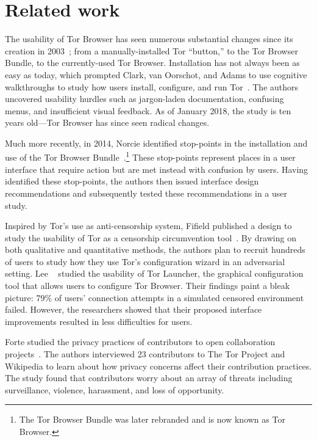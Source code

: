\section{Related work}
\label{sec:related-work}

The usability of Tor Browser has seen numerous substantial changes since its
creation in 2003~\cite{Syverson2005a}; from a manually-installed Tor ``button,''
to the Tor Browser Bundle, to the currently-used Tor Browser.  Installation has
not always been as easy as today, which prompted Clark, van Oorschot, and Adams
to use cognitive walkthroughs to study how users install, configure, and run
Tor~\cite{Clark2007a}.  The authors uncovered usability hurdles such as
jargon-laden documentation, confusing menus, and insufficient visual feedback.
As of January 2018, the study is ten years old---Tor Browser has since seen
radical changes.

Much more recently, in 2014, Norcie \ea identified stop-points in the
installation and use of the Tor Browser Bundle~\cite{Norcie2014a}.\footnote{The
Tor Browser Bundle was later rebranded and is now known as Tor Browser.}  These
stop-points represent places in a user interface that require action but are met
instead with confusion by users.  Having identified these stop-points, the
authors then issued interface design recommendations and subsequently tested
these recommendations in a user study.

Inspired by Tor's use as anti-censorship system, Fifield \ea published a design
to study the usability of Tor as a censorship circumvention
tool~\cite{Fifield2015a}.  By drawing on both qualitative and quantitative
methods, the authors plan to recruit hundreds of users to study how they use
Tor's configuration wizard in an adversarial setting.  Lee \ea~\cite{Lee2017a}
studied the usability of Tor Launcher, the graphical configuration tool that
allows users to configure Tor Browser.  Their findings paint a bleak picture:
79\% of users' connection attempts in a simulated censored environment failed.
However, the researchers showed that their proposed interface improvements
resulted in less difficulties for users.

Forte \ea studied the privacy practices of contributors to open collaboration
projects~\cite{Forte2017a}.  The authors interviewed 23 contributors to The Tor
Project and Wikipedia to learn about how privacy concerns affect their
contribution practices.  The study found that contributors worry about an array
of threats including surveillance, violence, harassment, and loss of
opportunity.

